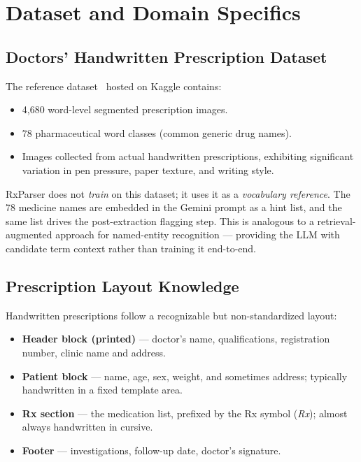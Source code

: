 \documentclass[12pt,a4paper]{article}
\begin{document}
\section{Dataset and Domain Specifics}

\subsection{Doctors' Handwritten Prescription Dataset}

The reference dataset~\cite{bdprescription} hosted on Kaggle contains:

\begin{itemize}[noitemsep]
    \item 4{,}680 word-level segmented prescription images.
      \item 78 pharmaceutical word classes (common generic drug names).
    \item Images collected from actual handwritten prescriptions, exhibiting
          significant variation in pen pressure, paper texture, and writing style.
\end{itemize}

RxParser does not \emph{train} on this dataset; it uses it as a \emph{vocabulary
reference}. The 78 medicine names are embedded in the Gemini prompt as a hint list,
and the same list drives the post-extraction flagging step. This is analogous to
a retrieval-augmented approach for named-entity recognition — providing the LLM
with candidate term context rather than training it end-to-end.

\subsection{Prescription Layout Knowledge}

Handwritten prescriptions follow a recognizable but non-standardized layout:

\begin{itemize}[noitemsep]
    \item \textbf{Header block (printed)} — doctor's name, qualifications,
          registration number, clinic name and address.
    \item \textbf{Patient block} — name, age, sex, weight, and sometimes address;
          typically handwritten in a fixed template area.
    \item \textbf{Rx section} — the medication list, prefixed by the Rx symbol
          (\textit{Rx}); almost always handwritten in cursive.
    \item \textbf{Footer} — investigations, follow-up date, doctor's signature.
\end{itemize}
\end{document}
